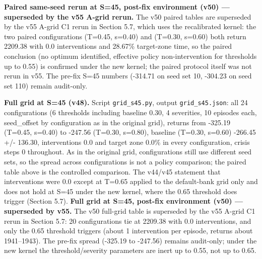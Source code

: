 \documentclass[11pt]{article}
\begin{document}
\textbf{Paired same-seed rerun at S=45, post-fix environment (v50) --- superseded by the v55 A-grid rerun.} The v50 paired tables are superseded by the v55 A-grid C1 rerun in Section 5.7, which uses the recalibrated kernel: the two paired configurations (T=0.45, s=0.40) and (T=0.30, s=0.60) both return 2209.38 with 0.0 interventions and 28.67\% target-zone time, so the paired conclusion (no optimum identified, effective policy non-intervention for thresholds up to 0.55) is confirmed under the new kernel; the paired protocol itself was not rerun in v55. The pre-fix S=45 numbers (-314.71 on seed set 10, -304.23 on seed set 110) remain audit-only.

\textbf{Full grid at S=45 (v48).} Script \texttt{grid\_s45.py}, output \texttt{grid\_s45.json}: all 24 configurations (6 thresholds including baseline 0.30, 4 severities, 10 episodes each, seed\_offset by configuration as in the original grid), returns from -325.19 (T=0.45, s=0.40) to -247.56 (T=0.30, s=0.80), baseline (T=0.30, s=0.60) -266.45 +/- 136.30, interventions 0.0 and target zone 0.0\% in every configuration, crisis steps 0 throughout. As in the original grid, configurations still use different seed sets, so the spread across configurations is not a policy comparison; the paired table above is the controlled comparison. The v44/v45 statement that interventions were 0.0 except at T=0.65 applied to the default-bank grid only and does not hold at S=45 under the new kernel, where the 0.65 threshold does trigger (Section 5.7). \textbf{Full grid at S=45, post-fix environment (v50) --- superseded by v55.} The v50 full-grid table is superseded by the v55 A-grid C1 rerun in Section 5.7: 20 configurations tie at 2209.38 with 0.0 interventions, and only the 0.65 threshold triggers (about 1 intervention per episode, returns about 1941--1943). The pre-fix spread (-325.19 to -247.56) remains audit-only; under the new kernel the threshold/severity parameters are inert up to 0.55, not up to 0.65.
\end{document}
